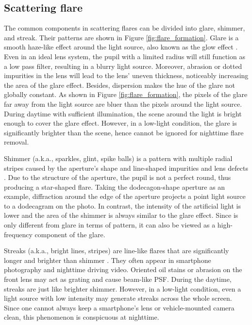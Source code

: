 \documentclass{article}
\newcommand{\yuekun}[1]{{\color{black}{#1}}}
\begin{document}
\subsection{Scattering flare} 
\vspace{-2mm}
The common components in scattering flares can be divided into glare, shimmer, and streak. Their patterns are shown in Figure \ref{fig:flare_formation}. 
Glare is a smooth haze-like effect around the light source, also known as the glow effect \yuekun{\cite{holladay1926fundamentals}}. 
Even in an ideal lens system, the pupil with a limited radius will still function as a low pass filter, resulting in a blurry light source. 
Moreover, abrasion or dotted impurities in the lens will lead to the lens' uneven thickness, noticeably increasing the area of the glare effect. 
Besides, dispersion makes the hue of the glare not globally constant. As shown in Figure \ref{fig:flare_formation}, the pixels of the glare far away from the light source are bluer than the pixels around the light source.  
During daytime with sufficient illumination, the scene around the light is bright enough to cover the glare effect. 
However, in a low-light condition, the glare is significantly brighter than the scene, hence cannot be ignored for nighttime flare removal. 

Shimmer (a.k.a., sparkles, glint, spike balls) is a pattern with multiple radial stripes caused by the aperture's shape and line-shaped impurities and lens defects \cite{flare_simulation1}. 
Due to the structure of the aperture, the pupil is not a perfect round, thus producing a star-shaped flare. 
Taking the dodecagon-shape aperture as an example, diffraction around the edge of the aperture projects a point light source to a dodecagram on the photo. 
\yuekun{Different from the aperture, line-shaped lens defects always lead to uneven shimmer. For the lens flare in the daytime, as a light source with high intensity, the sun will leave bright shimmers over the whole screen.}
In contrast, the intensity of the artificial light is lower and the area of the shimmer is always similar to the glare effect. 
Since \yuekun{shimmer} is only different from glare in terms of pattern, it can also be viewed as a high-frequency component of the glare.

Streaks (a.k.a., bright lines, stripes) are line-like flares that are significantly longer and brighter than shimmer \yuekun{\cite{rouf2011glare,rank_1}}. 
They often appear in smartphone photography and nighttime driving video. 
Oriented oil stains or abrasion on the front lens may act as grating and cause beam-like PSF. 
During the daytime, streaks are just like brighter shimmer. 
However, in a low-light condition, even a light source with low intensity may generate streaks across the whole screen. 
Since one cannot always keep a smartphone's lens or vehicle-mounted camera clean, this phenomenon is conspicuous at nighttime.
\end{document}
